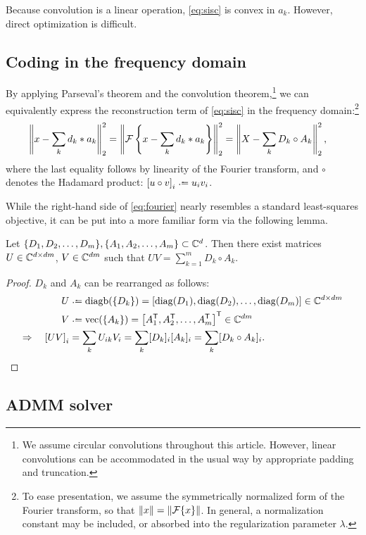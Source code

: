 \documentclass{article} %
\begin{document}
Because convolution is a linear operation, \eqref{eq:sisc} is convex in $a_k$.  
However, direct optimization is difficult.

\subsection{Coding in the frequency domain}
By applying Parseval's theorem and the convolution theorem,\footnote{We assume circular
convolutions throughout this article. However, linear convolutions can be accommodated
in the usual way by appropriate padding and truncation.} we can equivalently express the 
reconstruction term of \eqref{eq:sisc} in the frequency domain:\footnote{To ease
presentation, we assume the symmetrically normalized form of the Fourier transform, 
so that $\|x\| = \|\mathcal{F}\{x\}\|$. In general, a normalization constant may be included, 
or absorbed into the regularization parameter $\lambda$.}
\begin{align}
\left\|x - \sum_k d_k * a_k\right\|_2^2 &= \left\|\mathcal{F}\left\{x - \sum_k d_k *
a_k\right\}\right\|_2^2
= \left\| X - \sum_k D_k \circ A_k\right\|_2^2,\label{eq:fourier}
\end{align}
where the last equality follows by linearity of the Fourier transform, and $\circ$
denotes the Hadamard product: ${[u\circ v]}_i \defeq u_i v_i$.

While the right-hand side of \eqref{eq:fourier} nearly resembles a standard
least-squares objective, it can be put into a more familiar form via the following
lemma.
\begin{lemma}
Let $\{D_1, D_2, \dots, D_m\}, \{A_1, A_2, \dots, A_m\} \subset \mathbb{C}^d$.  
Then there exist matrices ${U \in \mathbb{C}^{d\times dm}}$, ${V \in \mathbb{C}^{dm}}$ such that 
${UV = \sum_{k=1}^m D_k \circ A_k}$.
\end{lemma}
\begin{proof}
$D_k$ and $A_k$ can be rearranged as follows:
\begin{align*}
U &\defeq \diagb(\{D_k\}) = \left[\diag(D_1), \diag(D_2), \dots, \diag(D_m)\right] \in \C^{d\times dm}\\
V &\defeq \vectorize(\{A_k\}) = \left[A_1\trans, A_2\trans, \dots,
A_m\trans\right]\trans \in \C^{dm}\\
\Rightarrow \quad {[UV]}_i &= \sum_k U_{ik} V_i = \sum_k [D_k]_i [A_k]_i = \sum_k [D_k \circ A_k]_i.
\end{align*}
\end{proof}


\subsection{ADMM solver}
\cite{boyd2011}
\end{document}
